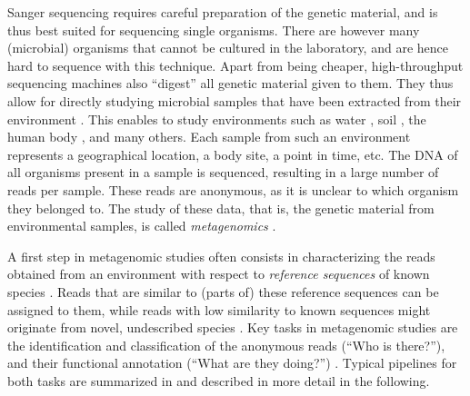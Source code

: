 Sanger sequencing requires careful preparation of the genetic material,
and is thus best suited for sequencing single organisms.
There are however many (microbial) organisms that cannot be cultured in the laboratory,
and are hence hard to sequence with this technique.
Apart from being cheaper, high-throughput sequencing machines also ``digest'' all genetic material given to them.
They thus allow for directly studying microbial samples
that have been extracted from their environment \cite{Morgan2010,Edwards2013,Sunagawa2013a}.
This enables to study environments such as
water \cite{Karsenti2011,Giner2016,Gran-Stadniczenko2017},
soil \cite{Dupont2016,Mahe2017},
the human body \cite{Huttenhower2012,Methe2012,Matsen2015,Wang2015},
and many others.
Each sample from such an environment represents a geographical location, a body site, a point in time, etc.
The \ac{DNA} of all organisms present in a sample is sequenced,
resulting in a large number of reads per sample.
These reads are anonymous, as it is unclear to which organism they belonged to.
The study of these data, that is, the genetic material from environmental samples,
is called \emph{metagenomics} \cite{Oulas2015}.


A first step in metagenomic studies often consists in characterizing the reads obtained from an environment
with respect to \emph{reference sequences} of known species \cite{Hug2016}.
Reads that are similar to (parts of) these reference sequences can be assigned to them,
while reads with low similarity to known sequences might originate from novel, undescribed species \cite{Temperton2012,Peabody2015}.
Key tasks in metagenomic studies are the identification and classification of the anonymous reads (``Who is there?''),
and their functional annotation (``What are they doing?'') \cite{Desai2012,Peabody2015,Lindgreen2016}.
Typical pipelines for both tasks are summarized in 
and described in more detail in the following.

